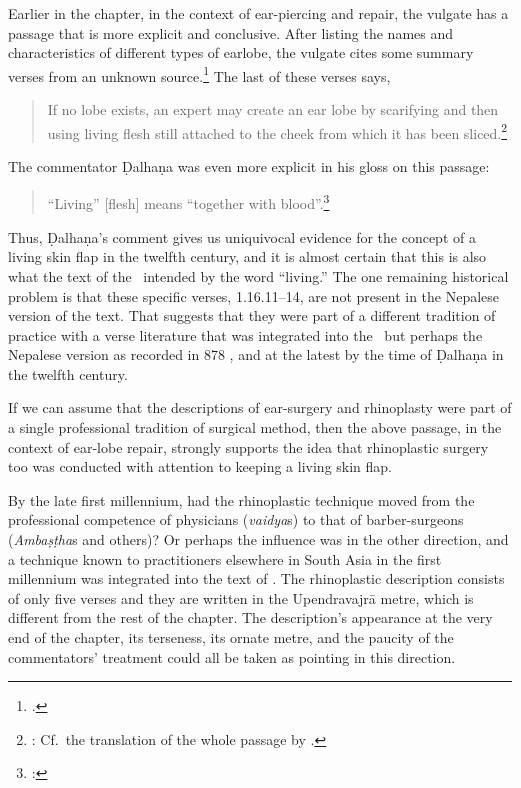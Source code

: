 Earlier in the chapter, in the context of ear-piercing and repair, the vulgate has
a passage that is more explicit and conclusive.  After listing the names and
characteristics of different types of earlobe, the vulgate cites some summary
verses from an unknown source.\footnote{.}  The last of these
    verses says,
    \begin{quote}
            If no lobe exists, an expert may create an ear lobe by scarifying and
then using living flesh still attached to the cheek from which it has
been sliced.\footnote{:  
    Cf.\ the translation of the whole passage by \citet[94]{wuja-2003}.}
    \end{quote}
The commentator Ḍalhaṇa was even more explicit in his gloss on this passage:
\begin{quote}
    “Living” [flesh] means “together with blood”.\footnote{:
    }
\end{quote}
Thus, Ḍalhaṇa's comment gives us uniquivocal evidence for the concept of a living
skin flap in the twelfth century, and it is almost certain that this is also what
the text of the \SS\ intended by the word “living.”  The one remaining historical
problem is that these specific verses, 1.16.11--14, are not present in the
Nepalese version of the text.  That suggests that they were part of a different
tradition of practice with a verse literature that was integrated into the \SS\
but perhaps the Nepalese version as recorded in 878 \CE, and at the latest by the
time of Ḍalhaṇa in the twelfth century. 

If we can assume that the descriptions of ear-surgery and rhinoplasty were part of
a single professional tradition of surgical method, then the above passage, in the
context of ear-lobe repair, strongly supports the idea that rhinoplastic surgery
too was conducted with attention to keeping a living skin flap.

By the late first millennium, had the rhinoplastic technique moved from the
professional competence of physicians (\emph{vaidya}s) to that of barber-surgeons
(\emph{Ambaṣṭha}s and others)?  Or perhaps the influence was in
the other direction, and a technique known to practitioners elsewhere in South
Asia in the first millennium was integrated into the text of \SS. The rhinoplastic
description consists of only five verses and they are written in the Upendravajrā
metre, which is different from the rest of the chapter.  The description's
appearance at the very end of the chapter, its terseness, its ornate metre, and
the paucity of the commentators' treatment could all be taken as pointing in this
direction.


